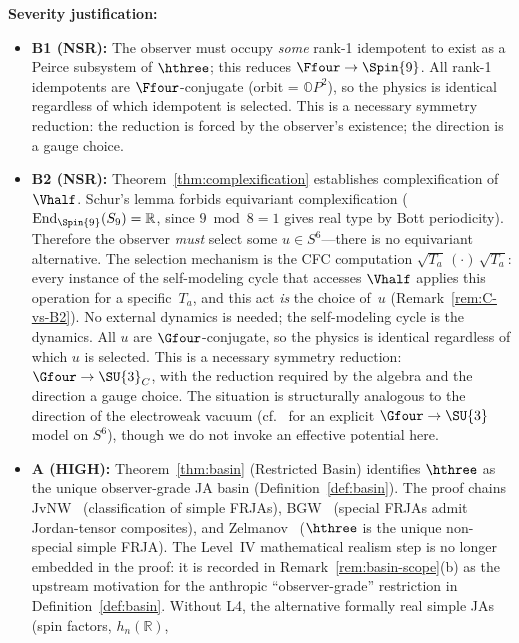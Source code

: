 \noindent\textbf{Severity justification:}
\begin{itemize}
  \item \textbf{B1 (NSR):} The observer must occupy \emph{some}
    rank-1 idempotent to exist as a Peirce subsystem of $\hthree$;
    this reduces $\Ffour\to\Spin{9}$.  All rank-1 idempotents are
    $\Ffour$-conjugate (orbit = $\mathbb{O}P^2$), so the physics
    is identical regardless of which idempotent is selected.  This
    is a necessary symmetry reduction: the reduction is forced by the
    observer's existence; the direction is a gauge choice.
  \item \textbf{B2 (NSR):} Theorem~\ref{thm:complexification} establishes
    complexification of $\Vhalf$.  Schur's lemma forbids equivariant
    complexification ($\mathrm{End}_{\Spin{9}}(S_9) = \mathbb{R}$,
    since $9\bmod 8 = 1$ gives real type by Bott periodicity).
    Therefore the observer \emph{must} select some $u\in S^6$---there
    is no equivariant alternative.  The selection mechanism is the CFC computation
    $\sqrt{T_a}\,(\cdot)\,\sqrt{T_a}$: every instance of the
    self-modeling cycle that accesses $\Vhalf$ applies
    this operation for a specific~$T_a$, and
    this act \emph{is} the choice of~$u$
    (Remark~\ref{rem:C-vs-B2}).  No external dynamics is needed;
    the self-modeling cycle is the dynamics.
    All $u$ are $\Gfour$-conjugate,
    so the physics is identical regardless of which $u$ is selected.
    This is a necessary symmetry reduction: $\Gfour\to\SU{3}_C$, with
    the reduction required by the algebra and the direction a gauge
    choice.  The situation is structurally analogous to the direction
    of the electroweak vacuum (cf.~\cite{FerraraEtAl2021} for an
    explicit $\Gfour\to\SU{3}$ model on $S^6$), though we do not
    invoke an effective potential here.
  \item \textbf{A (HIGH):} Theorem~\ref{thm:basin} (Restricted
    Basin) identifies $\hthree$ as the unique observer-grade JA
    basin (Definition~\ref{def:basin}).  The proof
    chains JvNW~\cite{JvNW1934} (classification of simple FRJAs),
    BGW~\cite{BGW2020} (special FRJAs admit Jordan-tensor
    composites), and Zelmanov~\cite{Zelmanov1979} ($\hthree$ is the
    unique non-special simple FRJA).  The Level~IV mathematical
    realism step is no longer embedded in the proof: it is recorded
    in Remark~\ref{rem:basin-scope}(b) as the upstream motivation
    for the anthropic ``observer-grade'' restriction in
    Definition~\ref{def:basin}.  Without L4, the alternative
    formally real simple JAs (spin factors, $h_n(\mathbb{R})$,

\end{itemize}
